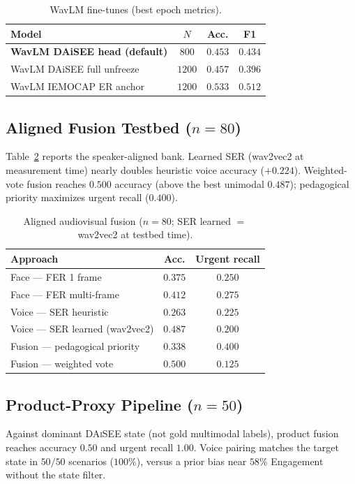 \documentclass[conference]{IEEEtran}
\begin{document}
\begin{table}[!t]
\caption{WavLM fine-tunes (best epoch metrics).}
\label{tab:ser}
\centering
\begin{tabular}{@{}lccc@{}}
\toprule
\textbf{Model} & \textbf{$N$} & \textbf{Acc.} & \textbf{F1} \\
\midrule
\textbf{WavLM DAiSEE head (default)} & $800$ & $\mathbf{0.453}$ & $\mathbf{0.434}$ \\
WavLM DAiSEE full unfreeze & $1200$ & $0.457$ & $0.396$ \\
WavLM IEMOCAP ER anchor & $1200$ & $0.533$ & $0.512$ \\
\bottomrule
\end{tabular}
\end{table}

\subsection{Aligned Fusion Testbed ($n{=}80$)}
Table~\ref{tab:fusion} reports the speaker-aligned bank. Learned SER
(wav2vec2 at measurement time) nearly doubles heuristic voice accuracy
($+0.224$). Weighted-vote fusion reaches $0.500$ accuracy (above the best
unimodal $0.487$); pedagogical priority maximizes urgent recall ($0.400$).

\begin{table}[!t]
\caption{Aligned audiovisual fusion ($n{=}80$; SER learned $=$ wav2vec2 at testbed time).}
\label{tab:fusion}
\centering
\begin{tabular}{@{}lcc@{}}
\toprule
\textbf{Approach} & \textbf{Acc.} & \textbf{Urgent recall} \\
\midrule
Face --- FER 1 frame & $0.375$ & $0.250$ \\
Face --- FER multi-frame & $0.412$ & $0.275$ \\
Voice --- SER heuristic & $0.263$ & $0.225$ \\
Voice --- SER learned (wav2vec2) & $0.487$ & $0.200$ \\
Fusion --- pedagogical priority & $0.338$ & $\mathbf{0.400}$ \\
Fusion --- weighted vote & $\mathbf{0.500}$ & $0.125$ \\
\bottomrule
\end{tabular}
\end{table}

\subsection{Product-Proxy Pipeline ($n{=}50$)}
Against dominant \textsc{DAiSEE} state (not gold multimodal labels), product
fusion reaches accuracy $0.50$ and urgent recall $1.00$. Voice pairing matches
the target state in $50/50$ scenarios ($100\%$), versus a prior bias near
$58\%$ Engagement without the state filter.
\end{document}
